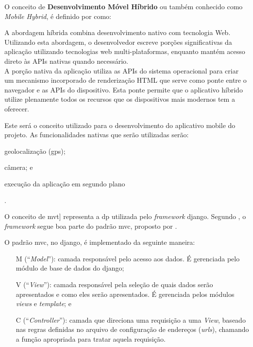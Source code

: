 O conceito de \textbf{Desenvolvimento Móvel Híbrido} ou também conhecido como \textit{Mobile Hybrid}, é definido por  como:
    \begin{citacao}
        A abordagem híbrida combina desenvolvimento nativo com tecnologia Web. Utilizando esta abordagem, o desenvolvedor escreve porções significativas da aplicação utilizando tecnologias web multi-plataformas, enquanto mantém acesso direto às APIs nativas quando necessário.\\
        A porção nativa da aplicação utiliza as APIs do sistema operacional para criar um mecanismo incorporado de renderização HTML que serve como ponte entre o navegador e as APIs do dispositivo. Esta ponte permite que o aplicativo híbrido utilize plenamente todos os recursos que os dispositivos mais modernos tem a oferecer.
    \end{citacao}
Este será o conceito utilizado para o desenvolvimento do aplicativo mobile do projeto. As funcionalidades nativas que serão utilizadas serão:%
    \begin{enumerate*}[label=\itshape\alph*\upshape)]
        \item geolocalização (gps);
        \item câmera; e
        \item execução da aplicação em segundo plano
    \end{enumerate*}.

O conceito de \gls{mvt}] representa a \gls{dp} utilizada pelo \textit{framework} \gls{django}. Segundo , o \textit{framework} segue boa parte do padrão \gls{mvc}, proposto por .

O padrão \gls{mvc}, no \gls{django}, é implementado da seguinte maneira:
    \begin{itemize}
        \item[M](``\textit{Model}''): camada responsável pelo acesso aos dados. É gerenciada pelo módulo de base de dados do \gls{django};
	    \item[V](``\textit{View}''): camada responsável pela seleção de quais dados serão apresentados e como eles serão apresentados. É gerenciada pelos módulos \textit{views} e \textit{template}; e
	    \item[C](``\textit{Controller}''): camada que direciona uma requisição a uma \textit{View}, baseado nas regras definidas no arquivo de configuração de endereços (\textit{urls}), chamando a função apropriada para tratar aquela requisição.
    \end{itemize}

